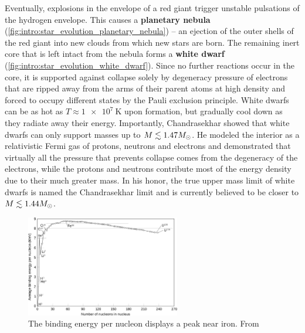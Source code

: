 Eventually, explosions in the envelope of a red giant trigger unstable pulsations of the hydrogen envelope.
This causes a \textbf{planetary nebula} (\cref{fig:intro:star_evolution_planetary_nebula}) -- an ejection of the outer shells of the red giant into new clouds from which new stars are born.
The remaining inert core that is left intact from the nebula forms a \textbf{white dwarf} (\cref{fig:intro:star_evolution_white_dwarf}).
Since no further reactions occur in the core, it is supported against collapse solely by degeneracy pressure of electrons that are ripped away from the arms of their parent atoms at high density and forced to occupy different states by the Pauli exclusion principle.
White dwarfs can be as hot as $T \approx \SI{1e7}{\kelvin}$ upon formation, but gradually cool down as they radiate away their energy.
Importantly, Chandrasekhar showed that white dwarfs can only support masses up to $M \lesssim 1.47 M_\odot$. \cite{ref:chandrasekhar_limit_nonideal}
He modeled the interior as a relativistic Fermi gas of protons, neutrons and electrons and demonstrated that virtually all the pressure that prevents collapse comes from the degeneracy of the electrons, while the protons and neutrons contribute most of the energy density due to their much greater mass.
In his honor, the true upper mass limit of white dwarfs is named the Chandrasekhar limit and is currently believed to be closer to $M \lesssim 1.44 M_\odot$. \cite{ref:glendenning}

\begin{figure}
\centering
%
\includegraphics[width=0.6\textwidth]{figures/binding_energy_curve.png}
\caption{\label{fig:intro:iron_peak}%
	The binding energy per nucleon displays a peak near iron.
	From \cite{ref:wiki_iron_peak_figure}
}
\end{figure}

